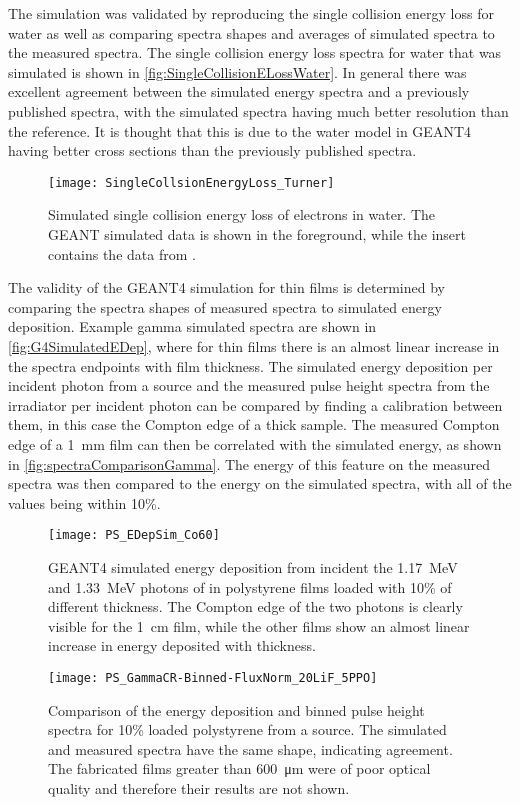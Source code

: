The simulation was validated by reproducing the single collision energy loss for water as well as comparing spectra shapes and averages of simulated spectra to the measured spectra.
The single collision energy loss spectra for water that was simulated is shown in \autoref{fig:SingleCollisionELossWater}.
In general there was excellent agreement between the simulated energy spectra and a previously published spectra\cite{turner_comparative_1982}, with the simulated spectra having much better resolution than the reference.
It is thought that this is due to the water model in GEANT4 having better cross sections than the previously published spectra.
\begin{figure}
  \centering
  \texttt{[image: SingleCollsionEnergyLoss\_Turner]}
  \caption[Single Collision Energy Loss of Water]{Simulated single collision energy loss of electrons in water. The GEANT simulated data is shown in the foreground, while the insert contains the data from \cite{turner_comparative_1982}.}
	\label{fig:SingleCollisionELossWater}
\end{figure}

The validity of the GEANT4 simulation for thin films is determined by comparing the spectra shapes of measured spectra to simulated energy deposition.
Example gamma simulated spectra are shown in \autoref{fig:G4SimulatedEDep}, where for thin films there is an almost linear increase in the spectra endpoints with film thickness.
The simulated energy deposition per incident photon from a  source and the measured pulse height spectra from the  irradiator per incident photon can be compared by finding a calibration between them, in this case the Compton edge of a thick sample.
The measured Compton edge of a \SI{1}{\mm} film can then be correlated with the simulated energy, as shown in \autoref{fig:spectraComparisonGamma}.
The energy of this feature on the measured spectra was then compared to the energy on the simulated spectra, with all of the values being within 10\%.
\begin{figure}
	\centering
    	\texttt{[image: PS\_EDepSim\_Co60]}
	\caption[GEANT4 Simulated Gamma Spectra in PS]{GEANT4 simulated energy deposition from incident the \SI{1.17}{\MeV} and \SI{1.33}{\MeV} photons of  in polystyrene films loaded with 10\%  of different thickness. The Compton edge of the two photons is clearly visible for the \SI{1}{\cm} film, while the other films show an almost linear increase in energy deposited with thickness.}
	\label{fig:G4SimulatedEDep}
\end{figure}
\begin{figure}
	\centering
   	\texttt{[image: PS\_GammaCR-Binned-FluxNorm\_20LiF\_5PPO]}
	\caption{Comparison of the energy deposition and binned pulse height spectra for 10\% loaded polystyrene from a  source. The simulated and measured spectra have the same shape, indicating agreement. The fabricated films greater than \SI{600}{\um} were of poor optical quality and therefore their results are not shown. }
	\label{fig:spectraComparisonGamma}
\end{figure}

